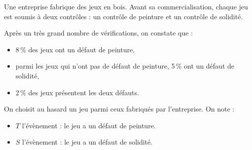 \medskip

Une entreprise fabrique des jeux en bois. Avant sa commercialisation, chaque jeu est soumis
à deux contrôles : un contrôle de peinture et un contrôle de solidité.

Après un très grand nombre de vérifications, on constate que :

\begin{itemize}
\item  8\,\% des jeux ont un défaut de peinture,
\item parmi les jeux qui n'ont pas de défaut de peinture, 5\,\% ont un défaut de solidité,
\item 2\,\% des jeux présentent les deux défauts.
\end{itemize}
On choisit au hasard un jeu parmi ceux fabriqués par l'entreprise. On note :
\begin{itemize}
\item $T$ l'évènement : \og le jeu a un défaut de peinture. \fg
\item $S$ l'évènement : \og le jeu a un défaut de solidité. \fg
\end{itemize}

\medskip

